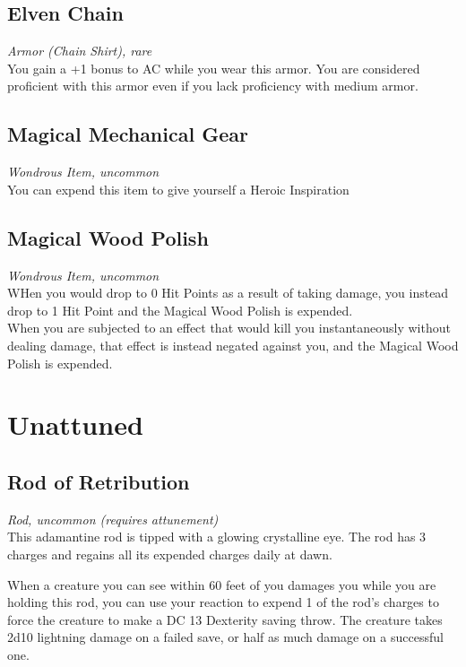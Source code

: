 \documentclass[letterpaper,openany,oneside,twocolumn]{book}
\begin{document}
\subsection*{Elven Chain}
\textit{Armor (Chain Shirt), rare}\\
You gain a +1 bonus to AC while you wear this armor. You are considered proficient with this armor even if you lack proficiency with medium armor.

\subsection*{Magical Mechanical Gear}
\textit{Wondrous Item, uncommon}\\
You can expend this item to give yourself a Heroic Inspiration

\subsection*{Magical Wood Polish}
\textit{Wondrous Item, uncommon}\\
WHen you would drop to 0 Hit Points as a result of taking damage, you instead drop to 1 Hit Point and the Magical Wood Polish is expended.\\
When you are subjected to an effect that would kill you instantaneously without dealing damage, that effect is instead negated against you, and the Magical Wood Polish is expended.

\section*{Unattuned}
\subsection*{Rod of Retribution}
\textit{Rod, uncommon (requires attunement)}\\
This adamantine rod is tipped with a glowing crystalline eye. The rod has 3 charges and regains all its expended charges daily at dawn.

When a creature you can see within 60 feet of you damages you while you are holding this rod, you can use your reaction to expend 1 of the rod's charges to force the creature to make a DC 13 Dexterity saving throw. The creature takes 2d10 lightning damage on a failed save, or half as much damage on a successful one.
\end{document}
